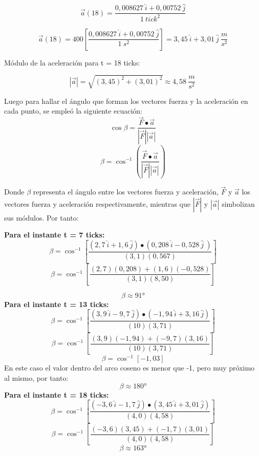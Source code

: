 \documentclass[../main.tex]{subfiles}
\begin{document}
\[\vec{a}\left(18\right)=\frac{0,008627\ \hat{i}+0,00752\ \hat{j}}{1\ {tick}^2}\]

\[\vec{a}\left(18\right)=400\left[\frac{0,008627\ \hat{i}+0,00752\ \hat{j}}{1\ s^2}\right]=3,45\ \hat{i}+3,01\ \hat{j}\ \frac{m}{s^2}\]

Módulo de la aceleración para t = 18 ticks:

\[\left|\vec{a}\right|=\sqrt{\left(3,45\right)^2+\left(3,01\right)^2}\approx4,58\ \frac{m}{s^2}\ \]

Luego para hallar el ángulo que forman los vectores fuerza y la aceleración en cada punto, se empleó la siguiente ecuación:
\[ \cos{\beta}=\frac{\vec{F}\bullet\vec{a}}{\left|\vec{F}\right|\left|\vec{a}\right|} \]
\[ \beta=\cos^{-1}{\left(\frac{\vec{F}\bullet\vec{a}}{\left|\vec{F}\right|\left|\vec{a}\right|}\right)} \]

Donde $\beta$ representa el ángulo entre los vectores fuerza y aceleración, $\vec{F}$ y $\vec{a}$ los vectores
fuerza y aceleración respectivamente, mientras que $\left|\vec{F}\right|$ y $\left|\vec{a}\right|$ simbolizan 
sus módulos. Por tanto:

\textbf{Para el instante t = 7 ticks:}
\[\beta=\cos^{-1}{\left[\frac{\left(2,7\ \hat{i}+1,6\ \hat{j}\right)\bullet\left(0,208\ \hat{i}-0,528\ \hat{j}\ \right)}{\left(3,1\right)\left(0,567\right)}\right]}\]
\[\beta=\cos^{-1}{\left[\frac{\left(2,7\right)\left(0,208\right)+\left(1,6\right)\left(-0,528\right)}{\left(3,1\right)\left(8,50\right)}\right]}\]

\[\beta\approx91°\]
\textbf{Para el instante t = 13 ticks:}
\[\beta=\cos^{-1}{\left[\frac{\left(3,9\ \hat{i}-9,7\ \hat{j}\right)\bullet\left(-1,94\ \hat{i}+3,16\ \hat{j}\right)}{\left(10\right)\left(3,71\right)}\right]}\]
\[\beta=\cos^{-1}{\left[\frac{\left(3,9\right)\left(-1,94\right)+\left(-9,7\right)\left(3,16\right)}{\left(10\right)\left(3,71\right)}\right]}\]
\[\beta=\cos^{-1}{\left[-1,03\right]}\]
En este caso el valor dentro del arco coseno es menor que -1, pero muy próximo al mismo, por tanto:
\[\beta\approx180°\]
\textbf{Para el instante t = 18 ticks:}
\[\beta=\cos^{-1}{\left[\frac{\left(-3,6\ \hat{i}-1,7\ \hat{j}\right)\bullet\left(3,45\ \hat{i}+3,01\ \hat{j}\right)}{\left(4,0\right)\left(4,58\right)}\right]}\]
\[\beta=\cos^{-1}{\left[\frac{\left(-3,6\right)\left(3,45\right)+\left(-1,7\right)\left(3,01\right)}{\left(4,0\right)\left(4,58\right)}\right]}\]
\[\beta\approx163°\]
\end{document}
